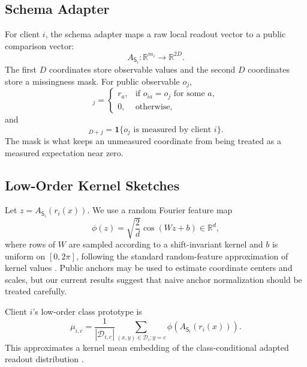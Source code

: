 \documentclass[preprint]{elsarticle}
\newcommand{\schema}{\mathsf{S}}
\newcommand{\R}{\mathbb{R}}
\newcommand{\cD}{\mathcal{D}}
\begin{document}
\subsection{Schema Adapter}

For client \(i\), the schema adapter maps a raw local readout vector to a public comparison vector:
\begin{equation}
    A_{\schema_i}: \R^{m_i}\rightarrow \R^{2D}.
\end{equation}
The first \(D\) coordinates store observable values and the second \(D\) coordinates store a missingness mask. For public observable \(o_j\),
\begin{equation}
    [A_{\schema_i}(r)]_j =
    \begin{cases}
        r_a, & \text{if } o_{ia}=o_j \text{ for some } a,\\
        0, & \text{otherwise},
    \end{cases}
\end{equation}
and
\begin{equation}
    [A_{\schema_i}(r)]_{D+j} =
    \mathbf{1}\{o_j \text{ is measured by client } i\}.
\end{equation}
The mask is what keeps an unmeasured coordinate from being treated as a measured expectation near zero.

\subsection{Low-Order Kernel Sketches}

Let \(z=A_{\schema_i}(r_i(x))\). We use a random Fourier feature map
\begin{equation}
    \phi(z)=\sqrt{\frac{2}{d}}\cos(Wz+b)\in\R^d,
\end{equation}
where rows of \(W\) are sampled according to a shift-invariant kernel and \(b\) is uniform on \([0,2\pi]\), following the standard random-feature approximation of kernel values \cite{rahimi2007random}. Public anchors may be used to estimate coordinate centers and scales, but our current results suggest that naive anchor normalization should be treated carefully.

Client \(i\)'s low-order class prototype is
\begin{equation}
    \mu_{i,c} =
    \frac{1}{|\cD_{i,c}|}\sum_{(x,y)\in\cD_i:y=c}
    \phi(A_{\schema_i}(r_i(x))).
\end{equation}
This approximates a kernel mean embedding of the class-conditional adapted readout distribution \cite{smola2007hilbert,gretton2012mmd}.
\end{document}

